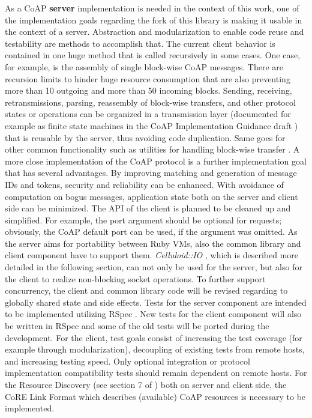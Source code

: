 		As a \ac{CoAP} \textbf{server} implementation is needed in the context
		of this work, one of the implementation goals regarding the fork of
		this library is making it usable in the context of a server.
		Abstraction and modularization to enable code reuse and testability are
		methods to accomplish that. The current client behavior is contained
		in one huge method that is called recursively in some cases. One case,
		for example, is the assembly of single block-wise \ac{CoAP} messages.
		There are recursion limits to hinder huge resource consumption that are
		also preventing more than 10 outgoing and more than 50 incoming blocks.
		Sending, receiving, retransmissions, parsing, reassembly of block-wise
		transfers, and other protocol states or operations can be organized in
		a transmission layer (documented for example as finite state machines
		in the \ac{CoAP} Implementation Guidance draft \cite{coap-guide}) that
		is reusable by the server, thus avoiding code duplication. Same goes
		for other common functionality such as utilities for handling
		block-wise transfer \cite{block}. A more close implementation of the
		\ac{CoAP} protocol is a further implementation goal that has several
		advantages.  By improving matching and generation of message IDs and
		tokens, security and reliability can be enhanced. With avoidance of
		computation on bogus messages, application state both on the server and
		client side can be minimized. The \ac{API} of the client is planned to
		be cleaned up and simplified. For example, the port argument should be
		optional for requests; obviously, the \ac{CoAP} default port can be
		used, if the argument was omitted. As the server aims for portability
		between Ruby \acp{VM}, also the common library and client component
		have to support them. \emph{Celluloid::IO} \cite{celluloid-io}, which
		is described more detailed in the following section, can not only be
		used for the server, but also for the client to realize non-blocking
		socket operations. To further support concurrency, the client and
		common library code will be revised regarding to globally shared state
		and side effects. Tests for the server component are intended to be
		implemented utilizing RSpec \cite{rspec}. New tests for the client
		component will also be written in RSpec and some of the old tests will
		be ported during the development. For the client, test goals consist of
		increasing the test coverage (for example through modularization),
		decoupling of existing tests from remote hosts, and increasing testing
		speed. Only optional integration or protocol implementation
		compatibility tests should remain dependent on remote hosts. For the
		Resource Discovery (see section 7 of \cite{coap}) both on server and
		client side, the \ac{CoRE} Link Format \cite{link} which describes
		(available) \ac{CoAP} resources is necessary to be implemented.

